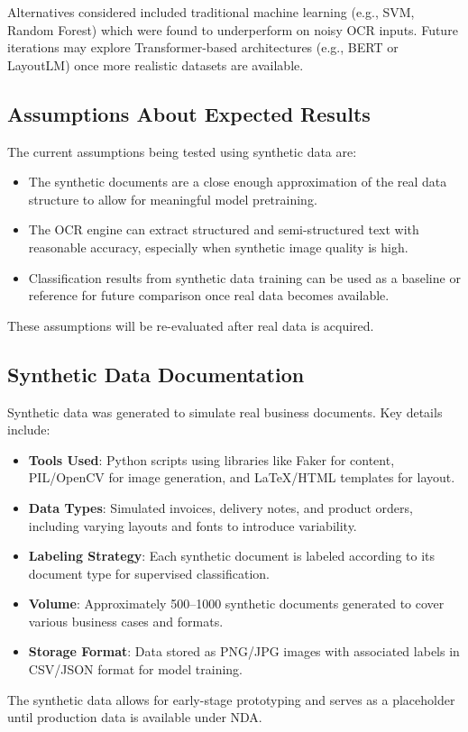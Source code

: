 \documentclass[11pt]{article}
\begin{document}
Alternatives considered included traditional machine learning (e.g., SVM, Random Forest) which were found to underperform on noisy OCR inputs. Future iterations may explore Transformer-based architectures (e.g., BERT or LayoutLM) once more realistic datasets are available.

\subsection{Assumptions About Expected Results}

The current assumptions being tested using synthetic data are:

\begin{itemize}
  \item The synthetic documents are a close enough approximation of the real data structure to allow for meaningful model pretraining.
  \item The OCR engine can extract structured and semi-structured text with reasonable accuracy, especially when synthetic image quality is high.
  \item Classification results from synthetic data training can be used as a baseline or reference for future comparison once real data becomes available.
\end{itemize}

These assumptions will be re-evaluated after real data is acquired.

\subsection{Synthetic Data Documentation}

Synthetic data was generated to simulate real business documents. Key details include:

\begin{itemize}
  \item \textbf{Tools Used}: Python scripts using libraries like Faker for content, PIL/OpenCV for image generation, and LaTeX/HTML templates for layout.
  \item \textbf{Data Types}: Simulated invoices, delivery notes, and product orders, including varying layouts and fonts to introduce variability.
  \item \textbf{Labeling Strategy}: Each synthetic document is labeled according to its document type for supervised classification.
  \item \textbf{Volume}: Approximately 500--1000 synthetic documents generated to cover various business cases and formats.
  \item \textbf{Storage Format}: Data stored as PNG/JPG images with associated labels in CSV/JSON format for model training.
\end{itemize}

The synthetic data allows for early-stage prototyping and serves as a placeholder until production data is available under NDA.
\end{document}
